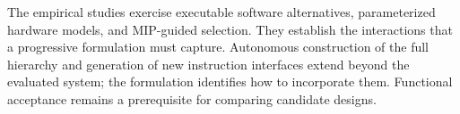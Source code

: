 The empirical studies exercise executable software alternatives, parameterized hardware models, and MIP-guided selection. They establish the interactions that a progressive formulation must capture. Autonomous construction of the full hierarchy and generation of new instruction interfaces extend beyond the evaluated system; the formulation identifies how to incorporate them. Functional acceptance remains a prerequisite for comparing candidate designs.
